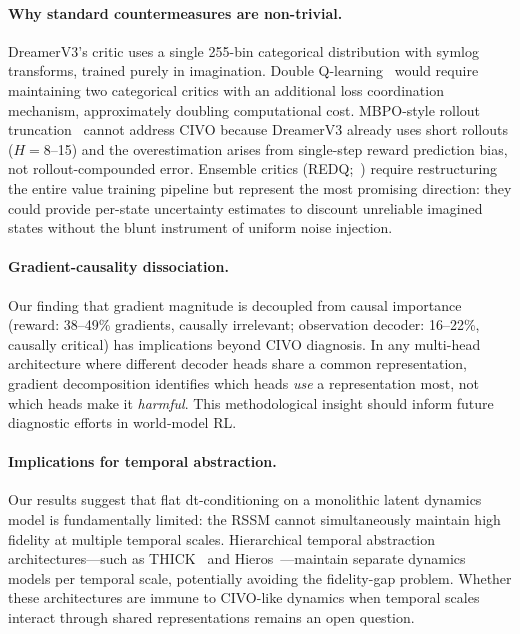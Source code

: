 \documentclass[10pt,letterpaper]{article}
\begin{document}
\paragraph{Why standard countermeasures are non-trivial.}
DreamerV3's critic uses a single 255-bin categorical distribution with symlog transforms, trained purely in imagination.
Double Q-learning~\citep{hasselt2010doubleq} would require maintaining two categorical critics with an additional loss coordination mechanism, approximately doubling computational cost.
MBPO-style rollout truncation~\citep{janner2019mbpo} cannot address CIVO because DreamerV3 already uses short rollouts ($H=8$--15) and the overestimation arises from single-step reward prediction bias, not rollout-compounded error.
Ensemble critics (REDQ;~\citealt{chen2021redq}) require restructuring the entire value training pipeline but represent the most promising direction: they could provide per-state uncertainty estimates to discount unreliable imagined states without the blunt instrument of uniform noise injection.

\paragraph{Gradient-causality dissociation.}
Our finding that gradient magnitude is decoupled from causal importance (reward: 38--49\% gradients, causally irrelevant; observation decoder: 16--22\%, causally critical) has implications beyond CIVO diagnosis.
In any multi-head architecture where different decoder heads share a common representation, gradient decomposition identifies which heads \emph{use} a representation most, not which heads make it \emph{harmful}.
This methodological insight should inform future diagnostic efforts in world-model RL.

\paragraph{Implications for temporal abstraction.}
Our results suggest that flat dt-conditioning on a monolithic latent dynamics model is fundamentally limited: the RSSM cannot simultaneously maintain high fidelity at multiple temporal scales.
Hierarchical temporal abstraction architectures---such as THICK~\citep{kim2024thick} and Hieros~\citep{makar2024hieros}---maintain separate dynamics models per temporal scale, potentially avoiding the fidelity-gap problem.
Whether these architectures are immune to CIVO-like dynamics when temporal scales interact through shared representations remains an open question.
\end{document}
